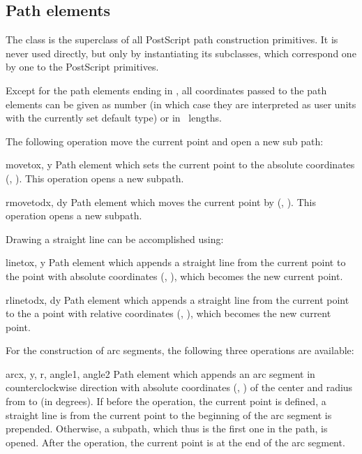 \subsection{Path elements}

\label{path:pathel}

The class  is the superclass of all PostScript path
construction primitives. It is never used directly, but only by
instantiating its subclasses, which correspond one by one to the
PostScript primitives.

Except for the path elements ending in , all coordinates
passed to the path elements can be given as number (in which case they
are interpreted as user units with the currently set default type) or in
\PyX\ lengths.

The following operation move the current point and open a new sub path:

\begin{classdesc}{moveto}{x, y}
Path element which sets the current point to the absolute coordinates (,
). This operation opens a new subpath.
\end{classdesc}

\begin{classdesc}{rmoveto}{dx, dy}
Path element which moves the current point by (, ).
This operation opens a new subpath.
\end{classdesc}

Drawing a straight line can be accomplished using:

\begin{classdesc}{lineto}{x, y}
Path element which appends a straight line from the current point to the
point with absolute coordinates (, ), which becomes
the new current point.
\end{classdesc}

\begin{classdesc}{rlineto}{dx, dy}
Path element which appends a straight line from the current point to the
a point with relative coordinates (, ), which becomes
the new current point.
\end{classdesc}

For the construction of arc segments, the following three operations
are available:

\begin{classdesc}{arc}{x, y, r, angle1, angle2}
Path element which appends an arc segment in counterclockwise direction
with absolute coordinates (, ) of the center and 
radius  from  to  (in degrees).
If before the operation, the current point is defined, a straight line
is from the current point to the beginning of the arc segment is
prepended. Otherwise, a subpath, which thus is the first one in the
path, is opened. After the operation, the current point is at the end
of the arc segment.
\end{classdesc}

